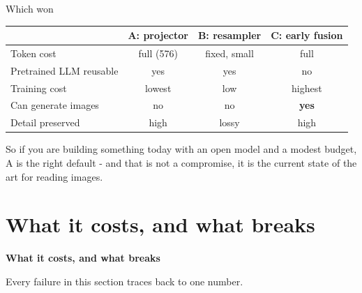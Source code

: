 \documentclass[aspectratio=169]{beamer}
\begin{document}
\begin{frame}{Which won}
  \small
  \begin{center}
    \footnotesize
    \begin{tabular}{lccc}
      \toprule
      & \textbf{A: projector} & \textbf{B: resampler} & \textbf{C: early fusion} \\
      \midrule
      Token cost & full (576) & fixed, small & full \\
      Pretrained LLM reusable & yes & yes & no \\
      Training cost & lowest & low & highest \\
      Can generate images & no & no & \textbf{yes} \\
      Detail preserved & high & lossy & high \\
      \bottomrule
    \end{tabular}
  \end{center}
  \vskip 10pt
  \vskip 6pt
  \footnotesize
  \centering
  So if you are building something today with an open model and a modest budget, A is the
  right default - and that is not a compromise, it is the current state of the art for
  reading images.
\end{frame}

\section{What it costs, and what breaks}

\begin{frame}[plain]
  \vfill
  \begin{center}
    {\Large\color{popblue}\textbf{What it costs, and what breaks}}\\[0.9em]
    \begin{minipage}{0.82\textwidth}\centering\small
      Every failure in this section traces back to one number.
    \end{minipage}
  \end{center}
  \vfill
\end{frame}
\end{document}
